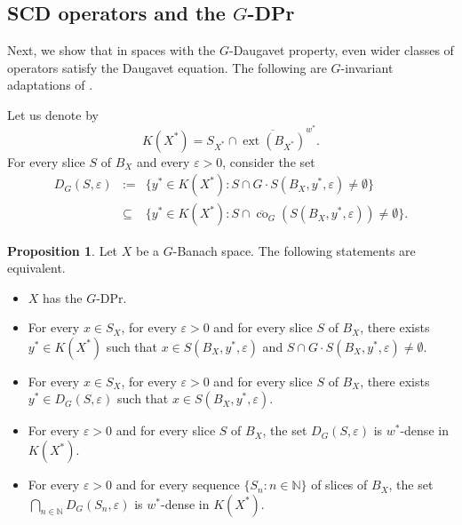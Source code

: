 \documentclass[a4paper,12pt]{amsart}
\theoremstyle{definition}
\newtheorem{proposition}[theorem]{Proposition}
\theoremstyle{definition}
\theoremstyle{remark}
\numberwithin{equation}{section}
\newcommand{\N}{\mathbb{N}}
\DeclareMathOperator{\co}{co}
\newcommand{\<}{\langle}
\renewcommand{\>}{\rangle}
\newcommand{\e}{\varepsilon}
\newcommand{\ext}{\operatorname{ext}}
\begin{document}
	\subsection{SCD operators and the $G$-DPr} Next, we show that in spaces with the $G$-Daugavet property, even wider classes of operators satisfy the Daugavet equation. The following are $G$-invariant adaptations of \cite{AKMMS}.
	
	Let us denote by
	\begin{equation*}
		K(X^*) = S_{X^*} \cap \overline{\ext(B_{X^*})}^{w^*}.
	\end{equation*}
	For every slice $S$ of $B_X$ and every $\e>0$, consider the set
	\begin{eqnarray*}
		D_G(S, \e)
		&:=&
		\{y^* \in K(X^*): S \cap G \cdot S(B_X, y^*, \e) \not= \emptyset\} \\
		&\subseteq&
		\{y^* \in K(X^*): S \cap \overline{\co}_G (S(B_X, y^*, \e)) \not= \emptyset \}.
	\end{eqnarray*}
	
	\begin{proposition} \label{prop:GDPandSCDslices}
		Let $X$ be a $G$-Banach space. The following statements are equivalent.
		\begin{itemize}
			\item[(i)] $X$ has the $G$-DPr.
			\item[(ii)] For every $x \in S_X$, for every $\e > 0$ and for every slice $S$ of $B_X$, there exists $y^* \in K(X^*)$ such that $x \in S(B_X, y^*, \e)$ and $S \cap G \cdot S(B_X, y^*, \e) \not= \emptyset$.
			\item[(iii)] For every $x \in S_X$, for every $\e > 0$ and for every slice $S$ of $B_X$, there exists $y^* \in D_G(S, \e)$ such that $x \in S(B_X, y^*, \e)$.
			\item[(iv)] For every $\e > 0$ and for every slice $S$ of $B_X$, the set $D_G(S, \e)$ is $w^*$-dense in $K(X^*)$.
			\item[(v)] For every $\e > 0$ and for every sequence $\{S_n: n \in \N\}$ of slices of $B_X$, the set $\bigcap_{n \in \N} D_G(S_n, \e)$ is $w^*$-dense in $K(X^*)$.
		\end{itemize}
	\end{proposition}
	
\end{document}
